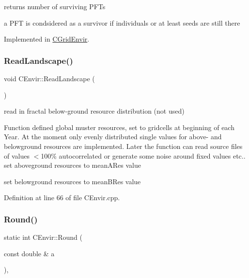 returns number of surviving P\+F\+Ts 

a P\+FT is condsidered as a survivor if individuals or at least seeds are still there 

Implemented in \mbox{\hyperlink{class_c_grid_envir_aed2b467efa481b601ef4147cc990debc}{C\+Grid\+Envir}}.

\mbox{\label{class_c_envir_a40fc9c5737af9c6c7e073009a64c498f}} 
\subsubsection{\texorpdfstring{ReadLandscape()}{ReadLandscape()}}
{\footnotesize\ttfamily void C\+Envir\+::\+Read\+Landscape (\begin{DoxyParamCaption}{ }\end{DoxyParamCaption})\hspace{0.3cm}{\ttfamily [static]}}



read in fractal below-\/ground resource distribution (not used) 

Function defined global muster resources, set to gridcells at beginning of each Year. At the moment only evenly distributed single values for above-\/ and belowground resources are implemented. Later the function can read source files of values $<$100\% autocorrelated or generate some noise around fixed values etc.. set aboveground resources to mean\+A\+Res value

set belowground resources to mean\+B\+Res value 

Definition at line 66 of file C\+Envir.\+cpp.

\mbox{\label{class_c_envir_adacbfd0480f38cded2d6b18ea2114405}} 
\subsubsection{\texorpdfstring{Round()}{Round()}}
{\footnotesize\ttfamily static int C\+Envir\+::\+Round (\begin{DoxyParamCaption}\item[{const double \&}]{a }\end{DoxyParamCaption})\hspace{0.3cm}{\ttfamily [inline]}, {\ttfamily [static]}}

